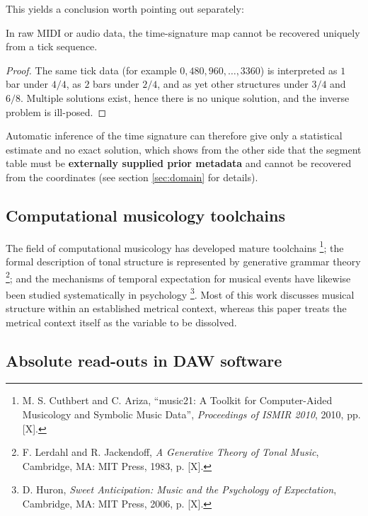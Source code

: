 \documentclass[11pt,a4paper]{article}
\begin{document}
This yields a conclusion worth pointing out separately:

\begin{proposition}
\label{prop:notick}
In raw MIDI or audio data, the time-signature map cannot be recovered uniquely from a
tick sequence.
\end{proposition}

\begin{proof}
The same tick data (for example $0,480,960,\dots,3360$) is interpreted as $1$ bar under
$4/4$, as $2$ bars under $2/4$, and as yet other structures under $3/4$ and $6/8$.
Multiple solutions exist, hence there is no unique solution, and the inverse problem is
ill-posed.
\end{proof}

Automatic inference of the time signature can therefore give only a statistical
estimate and no exact solution, which shows from the other side that the segment table
must be \textbf{externally supplied prior metadata} and cannot be recovered from the
coordinates (see section \ref{sec:domain} for details).

\subsection{Computational musicology toolchains}

The field of computational musicology has developed mature toolchains \footnote{M. S. Cuthbert and C. Ariza, ``music21: A Toolkit for Computer-Aided Musicology and Symbolic Music Data'', \emph{Proceedings of ISMIR 2010}, 2010, pp. [X].}; the formal description of tonal structure is represented by
generative grammar theory \footnote{F. Lerdahl and R. Jackendoff, \emph{A Generative Theory of Tonal Music}, Cambridge, MA: MIT Press, 1983, p. [X].}; and the mechanisms of temporal expectation for musical events have likewise been studied
systematically in psychology \footnote{D. Huron, \emph{Sweet Anticipation: Music and the Psychology of Expectation}, Cambridge, MA: MIT Press, 2006, p. [X].}. Most of this work discusses musical structure within an established
metrical context, whereas this paper treats the metrical context itself as the variable
to be dissolved.

\subsection{Absolute read-outs in DAW software}
\end{document}
